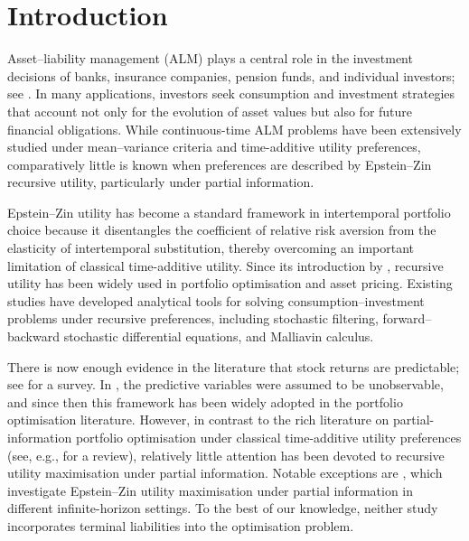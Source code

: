 \documentclass[12,reqno]{amsart}
\numberwithin{equation}{section}
\begin{document}


\section{Introduction}
Asset--liability management (ALM) plays a central role in the investment decisions of banks, insurance companies, pension funds, and individual investors; see \cite{luckner2003asset}. In many applications, investors seek consumption and investment strategies that account not only for the evolution of asset values but also for future financial obligations. While continuous-time ALM problems have been extensively studied under mean--variance criteria and time-additive utility preferences, comparatively little is known when preferences are described by Epstein--Zin recursive utility, particularly under partial information.

Epstein--Zin utility has become a standard framework in intertemporal portfolio choice because it disentangles the coefficient of relative risk aversion from the elasticity of intertemporal substitution, thereby overcoming an important limitation of classical time-additive utility. Since its introduction by \cite{epstein1989substitution}, recursive utility has been widely used in portfolio optimisation and asset pricing. Existing studies have developed analytical tools for solving consumption--investment problems under recursive preferences, including stochastic filtering, forward--backward stochastic differential equations, and Malliavin calculus.

There is now enough evidence in the literature that stock returns are predictable; see \cite{ait2001variable} for a survey. In \cite{xia2001learning}, the predictive variables were assumed to be unobservable, and since then this framework has been widely adopted in the portfolio optimisation literature. However, in contrast to the rich literature on partial-information portfolio optimisation under classical time-additive utility preferences (see, e.g., \cite{ceci2025portfolio,escobar2016portfolio,frey2012portfolio} for a review), relatively little attention has been devoted to recursive utility maximisation under partial information. Notable exceptions are \cite{chen2021dynamic,ma2023consumption}, which investigate Epstein--Zin utility maximisation under partial information in different infinite-horizon settings. To the best of our knowledge, neither study incorporates terminal liabilities into the optimisation problem.
\end{document}
